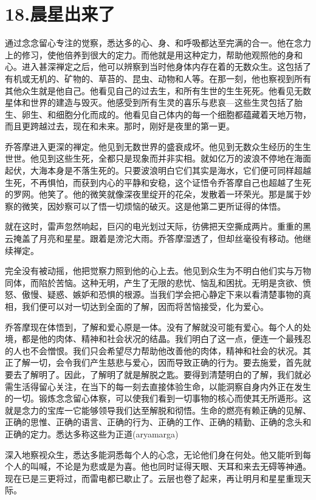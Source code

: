\documentclass[12pt,twoside,openany]{book}
\begin{document}
\chapter{18.晨星出来了}\label{ch18}

通过念念留心专注的觉察，悉达多的心、身、和呼吸都达至完满的合一。他在念力上的修习，使他倍养到很大的定力。而他就是用这种定力，帮助他观照他的身和心。进入甚深禅定之后，他可以辨察到当时他身体内存在着的无数众生。这包括了有机或无机的、矿物的、草苔的、昆虫、动物和人等。在那一刻，他也察视到所有其他众生就是他自己。他看见自己的过去生，和所有生世的生生死死。他看见无数星体和世界的建造与毁灭。他感受到所有生灵的喜乐与悲哀—这些生灵包括了胎生、卵生、和细胞分化而成的。他看见自己体内的每一个细胞都蕴藏着天地万物，而且更跨越过去，现在和未来。那时，刚好是夜里的第一更。

乔答摩进入更深的禅定。他见到无数世界的盛衰成坏。他见到无数众生经历的生生世世。他见到这些生死，全都只是现象而并非实相。就如亿万的波浪不停地在海面起伏，大海本身是不落生死的。只要波浪明白它们其实是海水，它们便可同样超越生死，不再惧怕，而获到内心的平静和安稳，这个证悟令乔答摩自己也超越了生死的罗网。他笑了。他的微笑就像深夜里绽开的花朵，发散着一环荣光。那是属于妙察的微笑，因妙察可以了悟一切烦恼的破灭。这是他第二更所证得的体悟。

就在这时，雷声忽然响起，巨闪的电光划过天际，彷佛把天空撕成两片。重重的黑云掩盖了月亮和星星。跟着是滂沱大雨。乔答摩湿透了，但却丝毫役有移动。他继续禅定。

完全没有被动摇，他把觉察力照到他的心上去。他见到众生为不明白他们实与万物同体，而陷於苦恼。这种无明，产生了无限的悲忧、恼乱和困扰。无明是贪欲、愤怒、傲慢、疑惑、嫉妒和恐惧的根源。当我们学会把心静定下来以看清楚事物的真相，我们便可以对一切达到全面的了解，因而将苦恼接受，化为爱心。

乔答摩现在体悟到，了解和爱心原是一体。没有了解就没可能有爱心。每个人的处境，都是他的肉体、精神和社会状况的结晶。我们明白了这一点，便连一个最残忍的人也不会憎恨。我们只会希望尽力帮助他改善他的肉体，精神和社会的状况。其正了解一切，会令我们产生慈悲与爱心，因而导致正确的行为。要去施爱，首先就要去了解明了。因此，了解明了就是解脱之匙。要得到清楚明白的了解，我们就必需生活得留心关注，在当下的每一刻去直接体验生命，以能洞察自身内外正在发生的一切。锻炼念念留心体察，可以使我们看到一切事物的核心而使其无所遁形。这就是念力的宝库一它能够领导我们达至解脱和彻悟。生命的燃亮有赖正确的见解、正确的思惟、正确的语言、正确的行为、正确的工作、正确的精勤、正确的念头和正确的定力。悉达多称这些为正道(aryamarga)

深入地察视众生，悉达多能洞悉每个人的心念，无论他们身在何处。他又能听到每个人的叫喊，不论是为悲或是为喜。他也同时证得天眼、天耳和来去无碍等神通。现在已是三更将过，而雷电都已歇止了。云层也卷了起来，再让明月和星星重现天际。
\end{document}
